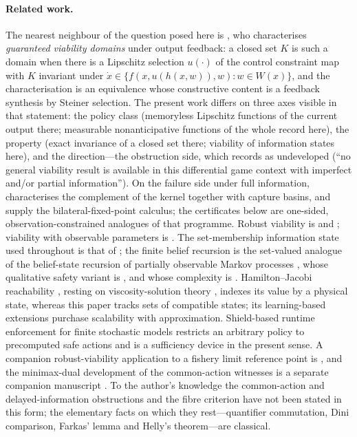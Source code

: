 \paragraph{Related work.} The nearest neighbour of the question posed here is \citet{doyen2000}, who characterises \emph{guaranteed viability domains} under output feedback: a closed set $K$ is such a domain when there is a Lipschitz selection $u(\cdot)$ of the control constraint map with $K$ invariant under $\dot x\in\{f(x,u(h(x,w)),w):w\in W(x)\}$, and the characterisation is an equivalence whose constructive content is a feedback synthesis by Steiner selection. The present work differs on three axes visible in that statement: the policy class (memoryless Lipschitz functions of the current output there; measurable nonanticipative functions of the whole record here), the property (exact invariance of a closed set there; viability of information states here), and the direction---the obstruction side, which \citet{doyen2000} records as undeveloped (``no general viability result is available in this differential game context with imperfect and/or partial information''). On the failure side under full information, \citet{aubin2001} characterises the complement of the kernel together with capture basins, and \citet{aubin2002} supply the bilateral-fixed-point calculus; the certificates below are one-sided, observation-constrained analogues of that programme. Robust viability is \citet{aubinfrankowska1990} and \citet{frankowska1989}; viability with observable parameters is \citet{quincampoix1994}. The set-membership information state used throughout is that of \citet{kurzhanski1997}; the finite belief recursion is the set-valued analogue of the belief-state recursion of partially observable Markov processes \citep{astrom1965,smallwood1973}, whose qualitative safety variant is \citet{chatterjee2009}, and whose complexity is \citet{papadimitriou1987}. Hamilton--Jacobi reachability \citep{mitchell2005,margellos2011,bansal2017}, resting on viscosity-solution theory \citep{crandall1992}, indexes its value by a physical state, whereas this paper tracks sets of compatible states; its learning-based extensions \citep{bansal2021} purchase scalability with approximation. Shield-based runtime enforcement for finite stochastic models \citep{alshiekh2018} restricts an arbitrary policy to precomputed safe actions and is a sufficiency device in the present sense. A companion robust-viability application to a fishery limit reference point is \citet{abaee2026fish}, and the minimax-dual development of the common-action witnesses is a separate companion manuscript \citep{abaee2026minimax}. To the author's knowledge the common-action and delayed-information obstructions and the fibre criterion have not been stated in this form; the elementary facts on which they rest---quantifier commutation, Dini comparison, Farkas' lemma and Helly's theorem---are classical.

